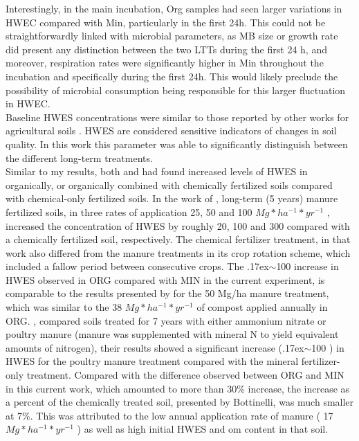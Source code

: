 	Interestingly, in the main incubation, Org samples had seen larger variations in HWEC compared with Min, particularly in the first 24h. This could not be straightforwardly linked with microbial parameters, as MB size or growth rate did present any distinction between the two LTTs during the first 24 h, and moreover, respiration rates were significantly higher in Min throughout the incubation and specifically during the first 24h. This would likely preclude the possibility of microbial consumption being responsible for this larger fluctuation in HWEC.\\
	Baseline HWES concentrations were similar to those reported by other works for agricultural soils \citep{haynes2005, yousefi2008, puget1998}. HWES are considered sensitive indicators of changes in soil quality. In this work this parameter was able to significantly distinguish between the different long-term treatments.\\
	Similar to my results, both \citet{yousefi2008} and \citet{bottinelli2017} had found increased levels of HWES in organically, or organically combined with chemically fertilized soils compared with chemical-only fertilized soils.
	In the work of \citet{yousefi2008}, long-term (5 years) manure fertilized soils, in three rates of application  25, 50 and 100 $ Mg * ha^{-1} * yr^{-1}  $ , increased the concentration of HWES by roughly 20, 100 and 300 \genericunit compared with a chemically fertilized soil, respectively. The chemical fertilizer treatment, in that work also differed from the manure treatments in its crop rotation scheme, which included a fallow period between consecutive crops. The {\raise.17ex\hbox{$\scriptstyle\mathtt{\sim}$}}100 \genericunit increase in HWES observed in ORG compared with MIN in the current experiment, is comparable to the results presented by \citeauthor{yousefi2008} for the 50 Mg/ha manure treatment, which was similar to the 38 $ Mg * ha^{-1} * yr^{-1}  $ of compost applied annually in ORG.
	\citet{bottinelli2017}, compared soils treated for 7 years with either ammonium nitrate or poultry manure (manure was supplemented with mineral N to yield equivalent amounts of nitrogen), their results  showed a significant increase ({\raise.17ex\hbox{$\scriptstyle\mathtt{\sim}$}}100 \genericunit) in HWES for the poultry manure treatment compared with the mineral fertilizer-only treatment.
	Compared with the difference observed between ORG and MIN in this current work, which amounted to more than 30\% increase, the increase as a percent of the  chemically treated soil, presented by Bottinelli, was much smaller at 7\%. This was attributed to the low annual application rate of manure ( 17 $ Mg * ha^{-1} * yr^{-1}  $ ) as well as high initial HWES and \gls{om} content in that soil.

